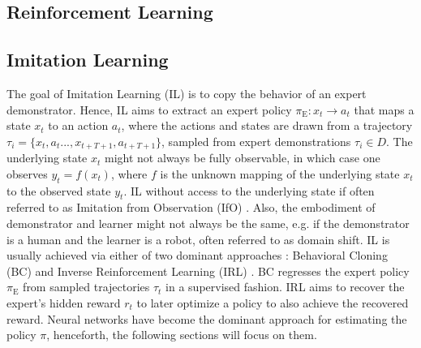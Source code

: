 \subsection{Reinforcement Learning}

\subsection{Imitation Learning}
The goal of Imitation Learning (IL) is to copy the behavior of an expert demonstrator. Hence, IL aims to extract an expert policy $\pi_\text{E}: x_t \rightarrow a_t$ that maps a state $x_t$ to an action $a_t$, where the actions and states are drawn from a trajectory $\tau_i = \{x_t,a_t...,x_{t+T+1},a_{t+T+1}\}$, sampled from expert demonstrations $\tau_i \in D$. The underlying state $x_t$ might not always be fully observable, in which case one observes $y_t = f(x_t)$, where $f$ is the unknown mapping of the underlying state $x_t$ to the observed state $y_t$. IL without access to the underlying state if often referred to as Imitation from Observation (IfO) \cite{liu2018imitation}. Also, the embodiment of demonstrator and learner might not always be the same, e.g. if the demonstrator is a human and the learner is a robot, often referred to as domain shift. IL is usually achieved via either of two dominant approaches \cite{osa2018algorithmic}: Behavioral Cloning (BC) \cite{pomerleau1991efficient} and Inverse Reinforcement Learning (IRL) \cite{ng2000algorithms}. BC regresses the expert policy $\pi_\text{E}$ from sampled trajectories $\tau_t$ in a supervised fashion. IRL aims to recover the expert's hidden reward $r_t$ to later optimize a policy to also achieve the recovered reward. Neural networks have become the dominant approach for estimating the policy $\pi$, henceforth, the following sections will focus on them.

